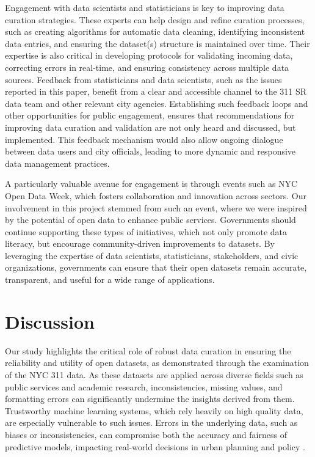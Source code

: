 \documentclass[linenumber]{jdsart}
\begin{document}
Engagement with data scientists and statisticians is key to improving 
data curation strategies. These experts can help design and refine 
curation processes, such as creating algorithms for automatic data 
cleaning, identifying inconsistent data entries, and ensuring the 
dataset(s) structure is maintained over time. Their expertise is also 
critical in developing protocols for validating incoming data, correcting 
errors in real\mbox{-}time, and ensuring consistency across multiple data sources. 
Feedback from statisticians and data scientists, such as the issues reported 
in this paper, benefit from a clear and accessible channel to the 311 SR data 
team and other relevant city agencies. Establishing such feedback loops 
and other opportunities for public engagement, ensures that 
recommendations for improving data curation and validation 
are not only heard and discussed, but implemented. This feedback 
mechanism would also allow ongoing dialogue between 
data users and city officials, leading to more dynamic 
and responsive data management practices.


A particularly valuable avenue for engagement is through events such as NYC 
Open Data Week, which fosters collaboration and innovation across sectors. 
Our involvement in this project stemmed from such an event, where we were 
inspired by the potential of open data to enhance public services. Governments 
should continue supporting these types of initiatives, which not only promote 
data literacy, but encourage community\mbox{-}driven improvements to datasets. 
By leveraging the expertise of data scientists, statisticians, stakeholders, 
and civic organizations, governments can ensure that their open datasets 
remain accurate, transparent, and useful for a wide range of applications.


\section{Discussion} 
\label{sec:discussion}
Our study highlights the critical role of robust data curation in
ensuring the reliability and utility of open datasets, as demonstrated
through the examination of the NYC 311 data. As these datasets are
applied across diverse fields such as public services and academic
research, inconsistencies, missing values, and formatting errors can
significantly undermine the insights derived from them. Trustworthy
machine learning systems, which rely heavily on high quality data, are
especially vulnerable to such issues. Errors in the underlying data,
such as biases or inconsistencies, can compromise both the accuracy
and fairness of predictive models, impacting real\mbox{-}world decisions in
urban planning and policy \citep{rahm2000data, geiger2020garbage}.
\end{document}
